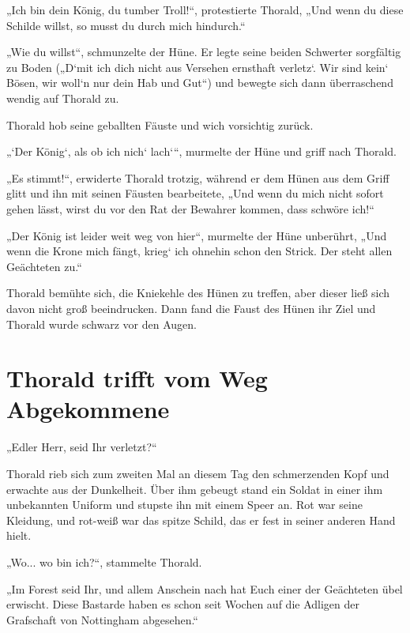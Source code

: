 „Ich bin dein König, du tumber Troll!“, protestierte Thorald, „Und wenn du diese Schilde willst, so musst du durch mich hindurch.“

„Wie du willst“, schmunzelte der Hüne. Er legte seine beiden Schwerter sorgfältig zu Boden („D‘mit ich dich nicht aus Versehen ernsthaft verletz‘. Wir sind kein‘ Bösen, wir woll‘n nur dein Hab und Gut“) und bewegte sich dann überraschend wendig auf Thorald zu.

Thorald hob seine geballten Fäuste und wich vorsichtig zurück.

„‘Der König‘, als ob ich nich‘ lach‘“, murmelte der Hüne und griff nach Thorald.

„Es stimmt!“, erwiderte Thorald trotzig, während er dem Hünen aus dem Griff glitt und ihn mit seinen Fäusten bearbeitete, „Und wenn du mich nicht sofort gehen lässt, wirst du vor den Rat der Bewahrer kommen, dass schwöre ich!“

„Der König ist leider weit weg von hier“, murmelte der Hüne unberührt, „Und wenn die Krone mich fängt, krieg‘ ich ohnehin schon den Strick. Der steht allen Geächteten zu.“

Thorald bemühte sich, die Kniekehle des Hünen zu treffen, aber dieser ließ sich davon nicht groß beeindrucken. Dann fand die Faust des Hünen ihr Ziel und Thorald wurde schwarz vor den Augen.













\newpage
\section{Thorald trifft vom Weg Abgekommene}

„Edler Herr, seid Ihr verletzt?“

Thorald rieb sich zum zweiten Mal an diesem Tag den schmerzenden Kopf und erwachte aus der Dunkelheit. Über ihm gebeugt stand ein Soldat in einer ihm unbekannten Uniform und stupste ihn mit einem Speer an. Rot war seine Kleidung, und rot-weiß war das spitze Schild, das er fest in seiner anderen Hand hielt.

„Wo... wo bin ich?“, stammelte Thorald.

„Im Forest seid Ihr, und allem Anschein nach hat Euch einer der Geächteten übel erwischt. Diese Bastarde haben es schon seit Wochen auf die Adligen der Grafschaft von Nottingham abgesehen.“


